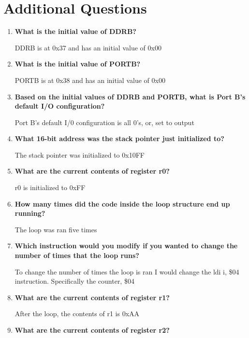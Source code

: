 \documentclass[12pt,letterpaper]{article}
\begin{document}
\section{Additional Questions}
\begin{enumerate}
	\item 
\textbf{		What is the initial value of DDRB? }
		
		DDRB is at 0x37 and has an initial value of 0x00
		
	
	
	\item 
\textbf{	What is the initial value of PORTB? }
	
	PORTB is at 0x38 and has an initial value of 0x00
	
	
	
	\item
\textbf{	Based on the initial values of DDRB and PORTB, what is Port B’s default I/O configuration? }
	
	Port B's default I/0 configuration is all 0's, or, set to output
	
	
	\item 
\textbf{	What 16-bit address was the stack pointer just initialized to? }
	
	The stack pointer was initialized to 0x10FF
	
	\item 
\textbf{	What are the current contents of register r0? }
	
	r0 is initialized to 0xFF
	
	
	
	\item 
\textbf{	How many times did the code inside the loop structure end up running? }
	
	The loop was ran five times
	
	
	\item 
\textbf{	Which instruction would you modify if you wanted to change the number of times that the loop runs? }
	
	To change the number of times the loop is ran I would change the ldi i, \$04 instruction. Specifically the counter, \$04 


	\item 
\textbf{	What are the current contents of register r1? }
	
	After the loop, the contents of r1 is 0xAA
	
	
	\item 
\textbf{	What are the current contents of register r2? }
	

\end{enumerate}
\end{document}
